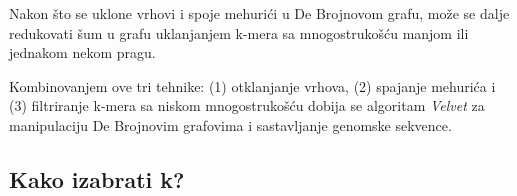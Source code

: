 \documentclass[12pt,oneside]{memoir}
\begin{document}
\begin{comment}
\begin{figure}[!ht]
\centering
\texttt{[image: Figura5\_22.PNG]}
\caption{Ovaj primer ilustruje kako algoritam turneje obilazi De Brojnov graf. Radi jasnoće, svaki čvor pokazuje poslednju bazu svojih k-mera i odgovarajući celobrojni stepen je njegova mnogostrukost. Algoritam izvodi pretragu u dobinu (BFS) i BFS stablo je prikazano podebljanim ivicama. Na slici (a) postoje 2 (ugnježdena) mehurića. Na slici (b) se izvodi BFS počevši od $r$. Kada se poseti $u$, dete $v$ od $u$ je posećeno. Identifikuje se mehurić i vrši se njegovo spajanje. Zatim, dobija se slika (c). Na slici (c) se nastavlja izvođenje BFS algoritma. Kada se posete $u'$, dete $v'$ od $u'$ je posećeno. Identifikuje se drugi mehurić i vrši se njegovo spajanje. Zatim se dobija slika (d). Na slici (d) se nastavlja izvođenje BFS algoritma. Kako se ne može identifikovati više nijedan mehurić, algoritam se završava.}
\label{fig:15}
\source{\cite{WingKinSung}}
\end{figure}

\end{comment}

Nakon što se uklone vrhovi i spoje mehurići u De Brojnovom grafu, može se dalje redukovati šum u grafu uklanjanjem k-mera sa mnogostrukošću manjom ili jednakom nekom pragu. 

Kombinovanjem ove tri tehnike: (1) otklanjanje vrhova, (2) spajanje mehurića i (3) filtriranje k-mera sa niskom mnogostrukošću dobija se algoritam \textit{Velvet} \cite{Velvet} za manipulaciju De Brojnovim grafovima i sastavljanje genomske sekvence.

\begin{comment}

i njegov psoudokod je prikazan na slici \ref{fig:16}.

\begin{figure}[!ht]
\centering
\texttt{[image: Figura5\_23.PNG]}
\caption{Algoritam za otklanjanje grešaka sekvencioniranja \cite{WingKinSung}}
\label{fig:16}
\end{figure}

\end{comment}

\newpage

\subsection{Kako izabrati k?}
\label{poglavlje:IspravnoK}
\end{document}
